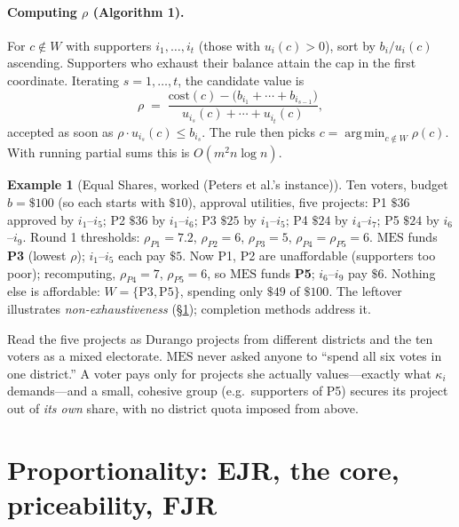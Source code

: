 \documentclass[11pt,letterpaper]{article}
\theoremstyle{definition}
\newtheorem{example}{Example}[section]
\theoremstyle{plain}
\theoremstyle{remark}
\newcommand{\budget}{b}            %
\newcommand{\cost}{\mathrm{cost}}  %
\newcommand{\MES}{\mathrm{MES}}
\DeclareMathOperator*{\argmin}{arg\,min}
\begin{document}
\paragraph{Computing $\rho$ (Algorithm 1).} For $c\notin W$ with supporters $i_1,\dots,i_t$ (those
with $u_i(c)>0$), sort by $b_{i}/u_{i}(c)$ ascending. Supporters who exhaust their balance attain
the cap in the first coordinate. Iterating $s=1,\dots,t$, the candidate value is
\[
  \rho \;=\; \frac{\cost(c)-\bigl(b_{i_1}+\cdots+b_{i_{s-1}}\bigr)}{u_{i_s}(c)+\cdots+u_{i_t}(c)},
\]
accepted as soon as $\rho\cdot u_{i_s}(c)\le b_{i_s}$. The rule then picks
$c=\argmin_{c\notin W}\rho(c)$. With running partial sums this is $O(m^2 n\log n)$.

\begin{example}[Equal Shares, worked (Peters et al.'s instance)]
Ten voters, budget $\budget=\$100$ (so each starts with $\$10$), approval utilities, five projects:
P1 $\$36$ approved by $i_1$--$i_5$; P2 $\$36$ by $i_1$--$i_6$; P3 $\$25$ by $i_1$--$i_5$;
P4 $\$24$ by $i_4$--$i_7$; P5 $\$24$ by $i_6$--$i_9$. Round 1 thresholds: $\rho_{P1}=7.2$,
$\rho_{P2}=6$, $\rho_{P3}=5$, $\rho_{P4}=\rho_{P5}=6$. $\MES$ funds \textbf{P3} (lowest $\rho$);
$i_1$--$i_5$ each pay $\$5$. Now P1, P2 are unaffordable (supporters too poor); recomputing,
$\rho_{P4}=7$, $\rho_{P5}=6$, so $\MES$ funds \textbf{P5}; $i_6$--$i_9$ pay $\$6$. Nothing else is
affordable: $W=\{\text{P3},\text{P5}\}$, spending only $\$49$ of $\$100$. The leftover illustrates
\emph{non-exhaustiveness} (\S\ref{sec:axioms}); completion methods address it.
\end{example}

\begin{connection}
Read the five projects as Durango projects from different districts and the ten voters as a mixed
electorate. $\MES$ never asked anyone to ``spend all six votes in one district.'' A voter pays only
for projects she actually values---exactly what $\kappa_i$ demands---and a small, cohesive group
(e.g.\ supporters of P5) secures its project out of \emph{its own} share, with no district quota
imposed from above.
\end{connection}

\section{Proportionality: EJR, the core, priceability, FJR}
\label{sec:axioms}
\end{document}
